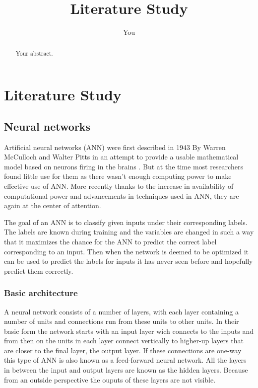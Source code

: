 \documentclass[a4paper]{article}
\title{Literature Study}
\author{You}
\begin{document}
\maketitle
\newpage
\tableofcontents
\newpage
\begin{abstract}
Your abstract.
\end{abstract}
\newpage
\section{Literature Study}
\subsection{Neural networks}
Artificial neural networks (ANN) were first described in 1943 By Warren McCulloch and Walter Pitts in an attempt to provide a usable mathematical model based on neurons firing in the brains \cite{Pitts43}. But at the time most researchers found little use for them as there wasn't enough computing power to make effective use of ANN. More recently thanks to the increase in availability of computational power and advancements in techniques used in ANN, they are again at the center of attention. 

The goal of an ANN is to classify given inputs under their corresponding labels. The labels are known during training and the variables are changed in such a way that it maximizes the chance for the ANN to predict the correct label corresponding to an input. Then when the network is deemed to be optimized it can be used to predict the labels for inputs it has never seen before and hopefully predict them correctly.

\subsubsection{Basic architecture}
A neural network consists of a number of layers, with each layer containing a number of units and connections run from these units to other units. In their basic form the network starts with an input layer wich connects to the inputs and from then on the units in each layer connect vertically to higher-up layers that are closer to the final layer, the output layer. If these connections are one-way this type of ANN is also known as a feed-forward neural network. All the layers in between the input and output layers are known as the hidden layers. Because from an outside perspective the ouputs of these layers are not visible.
\end{document}
